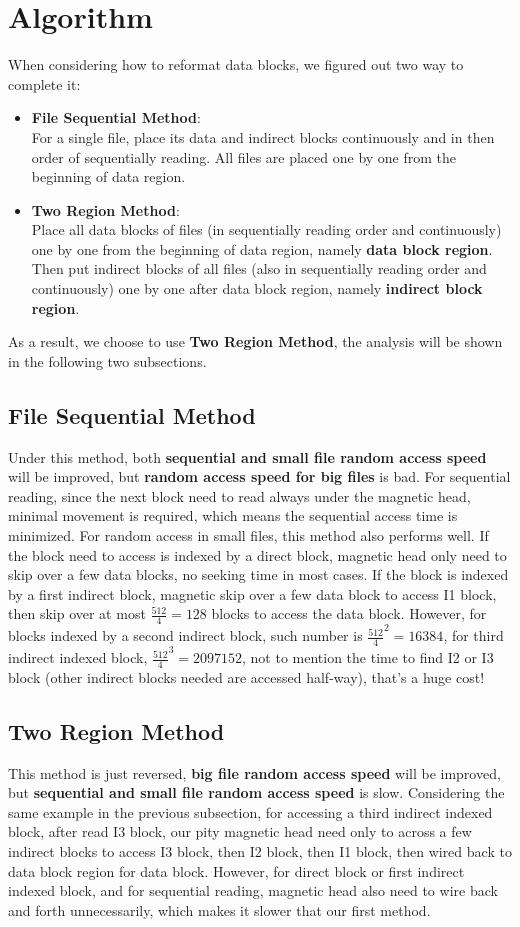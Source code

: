\documentclass{article}
\begin{document}
\section{Algorithm}
When considering how to reformat data blocks, we figured out two way to complete it:
\begin{itemize}
	\item \textbf{File Sequential Method}:\\
	For a single file, place its data and indirect blocks continuously and in then order of sequentially reading. All files are placed one by one from the beginning of data region.
	\item \textbf{Two Region Method}:\\
	Place all data blocks of files (in sequentially reading order and continuously) one by one from the beginning of data region, namely \textbf{data block region}. Then put indirect blocks of all files (also in sequentially reading order and continuously) one by one after data block region, namely \textbf{indirect block region}.
\end{itemize}
As a result, we choose to use \textbf{Two Region Method}, the analysis will be shown in the following two subsections.

\subsection{File Sequential Method}
Under this method, both \textbf{sequential and small file random access speed} will be improved, but \textbf{random access speed for big files} is bad. For sequential reading, since the next block need to read always under the magnetic head, minimal movement is required, which means the sequential access time is minimized. For random access in small files, this method also performs well. If the block need to access is indexed by a direct block, magnetic head only need to skip over a few data blocks, no seeking time in most cases. If the block is indexed by a first indirect block, magnetic skip over a few data block to access I1 block, then skip over at most $\frac{512}{4}=128$ blocks to access the data block. However, for blocks indexed by a second indirect block, such number is ${\frac{512}{4}}^2=16384$, for third indirect indexed block, ${\frac{512}{4}}^3=2097152$, not to mention the time to find I2 or I3 block (other indirect blocks needed are accessed half-way), that's a huge cost!

\subsection{Two Region Method}	
This method is just reversed, \textbf{big file random access speed} will be improved, but \textbf{sequential and small file random access speed} is slow. Considering the same example in the previous subsection, for accessing a third indirect indexed block, after read I3 block, our pity magnetic head need only to across a few indirect blocks to access I3 block, then I2 block, then I1 block, then wired back to data block region for data block. However, for direct block or first indirect indexed block, and for sequential reading, magnetic head also need to wire back and forth unnecessarily, which makes it slower that our first method.
\end{document}
